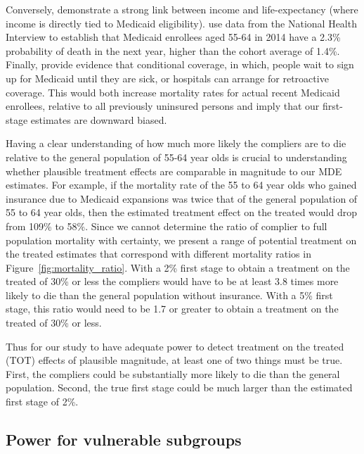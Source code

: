 \documentclass[12pt]{article}%
\begin{document}
  Conversely, \citet{chettyAssociationIncomeLife2016} demonstrate a strong link between income and life-expectancy (where income is directly tied to Medicaid eligibility). 
  \citet{millerMedicaidMortalityNew2019} use data from the National Health Interview to establish that Medicaid enrollees aged 55-64 in 2014 have a 2.3\% probability of death in the next year, higher than the cohort average of 1.4\%. 
  Finally, \citet{martonHealthInsuranceGenerosity2015} provide evidence that conditional coverage, in which, people wait to sign up for Medicaid until they are sick, or hospitals can arrange for retroactive coverage. 
  This would both increase mortality rates for actual recent Medicaid enrollees, relative to all previously uninsured persons and imply that our first-stage estimates are downward biased. 

  

Having a clear understanding of how much more likely the compliers are to die relative to the general population of 55-64 year olds is crucial to understanding whether plausible treatment effects are comparable in magnitude to our MDE estimates. 
For example, if the mortality rate of the 55 to 64 year olds  who  gained insurance due to Medicaid expansions was twice that of the general population of 55 to 64 year olds, then the estimated treatment effect on the treated would drop from 109\% to 58\%. 
Since we cannot determine the ratio of complier to full population mortality with certainty, we present a range of potential treatment on the treated estimates that correspond with different mortality ratios in Figure~\ref{fig:mortality_ratio}.
With a 2\% first stage to obtain a treatment on the treated of 30\% or less the compliers would have to be at least 3.8 times more likely to die than the general population without insurance.  
With a 5\% first stage, this ratio would need to be 1.7 or greater to obtain a treatment on the treated of 30\% or less. 

Thus for our study to have adequate power to detect treatment on the treated (TOT) effects of plausible magnitude, at least one of two things must be true. 
First, the compliers could be substantially more likely to die than the general population. 
Second, the true first stage could be much larger than the estimated first stage of 2\%. 



\subsection{Power for vulnerable subgroups}\label{sec:power_subgroup}
\end{document}
